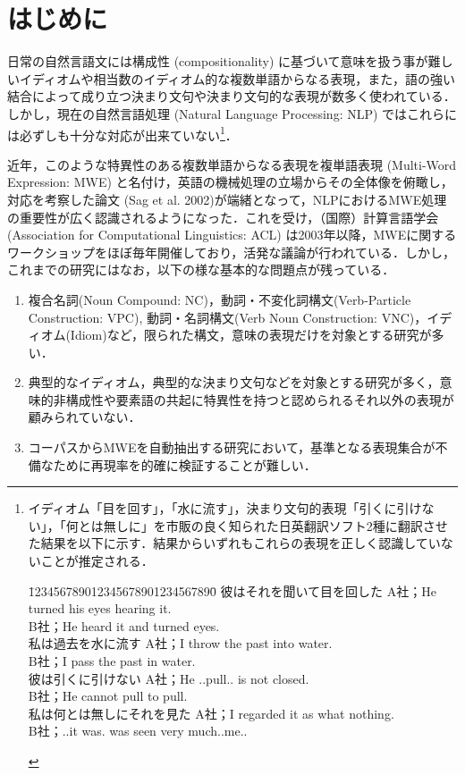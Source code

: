 \documentclass[japanese]{jnlp_1.4}
\begin{document}
\maketitle


\section{はじめに}

日常の自然言語文には構成性 (compositionality) に基づいて意味を扱う事が難しいイディオムや相当数のイディオム的な複数単語からなる表現，また，語の強い結合によって成り立つ決まり文句や決まり文句的な表現が数多く使われている．
しかし，現在の自然言語処理 (Natural Language Processing: NLP) ではこれらには必ずしも十分な対応が出来ていない\footnote{イディオム「目を回す」，「水に流す」，決まり文句的表現「引くに引けない」，「何とは無しに」を市販の良く知られた日英翻訳ソフト2種に翻訳させた結果を以下に示す．結果からいずれもこれらの表現を正しく認識していないことが推定される．
\begin{tabbing}
\hspace{30pt}\=123456789012345678901234567890\=\kill
\> 彼はそれを聞いて目を回した \> A社；He turned his eyes hearing it. \\                    
\> \> B社；He heard it and turned eyes. \\     
\> 私は過去を水に流す \> A社；I throw the past into water. \\            
\> \> B社；I pass the past in water.\\
\> 彼は引くに引けない \> A社；He ..pull.. is not closed.\\
\> \> B社；He cannot pull to pull.\\
\> 私は何とは無しにそれを見た \> A社；I regarded it as what nothing.\\
\> \> B社；..it was. was seen very much..me..\\
\end{tabbing}}． 

近年，このような特異性のある複数単語からなる表現を複単語表現 (Multi-Word Expression: MWE) と名付け，英語の機械処理の立場からその全体像を俯瞰し，対応を考察した論文
(Sag et al. 2002)が端緒となって，NLPにおけるMWE処理の重要性が広く認識されるようになった．これを受け，（国際）計算言語学会 (Association for Computational Linguistics: ACL) は2003年以降，MWEに関するワークショップをほぼ毎年開催しており，活発な議論が行われている．しかし，これまでの研究にはなお，以下の様な基本的な問題点が残っている．
\begin{enumerate}[　1.]
\item 複合名詞(Noun Compound: NC)，動詞・不変化詞構文(Verb-Particle Construction: VPC), 動詞・名詞構文(Verb Noun Construction: VNC)，イディオム(Idiom)など，限られた構文，意味の表現だけを対象とする研究が多い．
\item 典型的なイディオム，典型的な決まり文句などを対象とする研究が多く，意味的非構成性や要素語の共起に特異性を持つと認められるそれ以外の表現が顧みられていない．
\item コーパスからMWEを自動抽出する研究において，基準となる表現集合が不備なために再現率を的確に検証することが難しい．
\end{enumerate}
\end{document}

